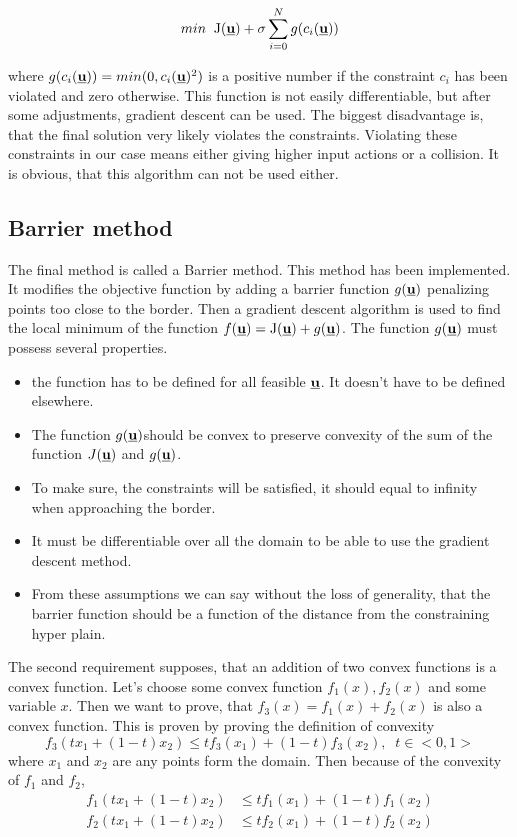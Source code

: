 \documentclass[a4paper,11pt,titlepage]{article}
\newcommand{\uvec}{\textbf{\underline{u}}}
\newcommand{\macf}{f(\uvec)}
\begin{document}
\begin{equation}
min\;\;\mathrm{J}(\uvec) + \sigma\sum_{i = 0}^N g(c_i(\uvec))
\end{equation}

where $g(c_i(\uvec)) = min(0, c_i(\uvec)^2)$ is a positive number if the constraint $c_i$ has been violated and zero otherwise. This function is not easily differentiable, but after some adjustments, gradient descent can be used. The biggest disadvantage is, that the final solution very likely violates the constraints. Violating these constraints in our case means either giving higher input actions or a collision. It is obvious, that this algorithm can not be used either.  

\subsection{Barrier method}
The final method is called a Barrier method. This method has been implemented. It modifies the objective function by adding a barrier function $g(\uvec)$ penalizing points too close to the border. Then a gradient descent algorithm is used to find the local minimum of the function $\macf = \mathrm{J}(\uvec) + g(\uvec)$. The function $g(\uvec)$ must possess several properties. 

\begin{itemize}
\item the function has to be defined for all feasible $\uvec$. It doesn't have to be defined elsewhere.
\item The function $g(\uvec)$should be convex to preserve convexity of the sum of the function $J(\uvec)$ and $g(\uvec)$.
\item  To make sure, the constraints will be satisfied, it should equal to infinity when approaching the border.
\item It must be differentiable over all the domain to be able to use the gradient descent method.
\item From these assumptions we can say without the loss of generality, that the barrier function should be a function of the distance from the constraining hyper plain.
\end{itemize}

The second requirement supposes, that an addition of two convex functions is a convex function. Let's choose some convex function $f_1(x), f_2(x)$ and some variable $x$. Then we want to prove, that $f_3(x) = f_1(x) + f_2(x)$ is also a convex function. This is proven by proving the definition of convexity 
\begin{equation}
\label{eq:sum_conv_def}
f_3(tx_1+(1-t)x_2) \leq tf_3(x_1) + (1-t)f_3(x_2), \;\; t  \in  <0, 1>
\end{equation}
where $x_1$ and $x_2$ are any points form the domain. Then because of the convexity of $f_1$ and $f_2$,
\begin{equation}
\label{eq:sum_conv_1}
\begin{split}
f_1(tx_1+(1-t)x_2) &\leq tf_1(x_1) + (1-t)f_1(x_2)\\
f_2(tx_1+(1-t)x_2) &\leq tf_2(x_1) + (1-t)f_2(x_2)\\
\end{split}
\end{equation}
\end{document}
